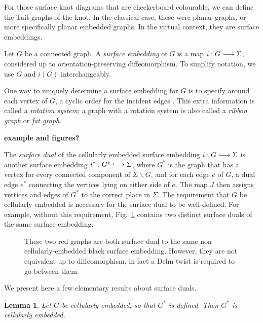 \documentclass[12pt]{report}
\newcommand{\inject}{\lhook\joinrel\longrightarrow}
\newcommand{\notered}[1]{{\color{Red} \textbf{#1}}}
\newtheorem*{lemma}{Lemma}
\begin{document}
For those surface knot diagrams that are checkerboard colourable, we can define the Tait graphs of the knot. In the classical case, these were planar graphs, or more specifically planar embedded graphs. In the virtual context, they are surface embeddings.

Let $G$ be a connected graph. A \textit{surface embedding} of $G$ is a map $i: G \inject \Sigma$, considered up to orientation-preserving diffeomorphism. To simplify notation, we use $G$ and $i(G)$ interchangeably.

One way to uniquely determine a surface embedding for $G$ is to specify around each vertex of $G$, a cyclic order for the incident edges \cite[Theorem 3.2.4]{graphs-on-surfaces}. This extra information is called a \textit{rotation system}; a graph with a rotation system is also called a \textit{ribbon graph} or \textit{fat graph}.

\notered{example and figures?}

The \textit{surface dual} of the cellularly embedded surface embedding $i: G \inject \Sigma$ is another surface embedding $i^{*}: G^{*} \inject \Sigma$, where $G^{*}$ is the graph that has a vertex for every connected component of  $\Sigma \smallsetminus G$, and for each edge $e$ of $G$, a dual edge $e^{\ast}$ connecting the vertices lying on either side of $e$. The map $J$ then assigns vertices and edges of $G^{*}$ to the correct place in $\Sigma$. The requirement that $G$ be cellularly embedded is necessary for the surface dual to be well-defined. For example, without this requirement, Fig.~\ref{fig:multiple_dual_graphs} contains two distinct surface duals of the same surface embedding.

\begin{figure}[hbt!]
	\centering
	\def\svgscale{0.45}
	
	
	\caption{These two red graphs are both surface dual to the same non cellularly-embedded black surface embedding. However, they are not equivalent up to diffeomorphism, in fact a Dehn twist is required to go between them.}
	\label{fig:multiple_dual_graphs}
\end{figure}


We present here a few elementary results about surface duals.

\begin{lemma}
Let $G$ be cellularly embedded, so that $G^{*}$ is defined. Then $G^{*}$ is cellularly embedded.
\end{lemma}
\end{document}
